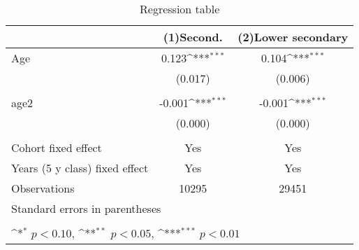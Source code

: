 \begin{table}[htbp]\centering
    \def\sym#1{\ifmmode^{#1}\else\(^{#1}\)\fi}
    \caption{Regression table \label{reg1}}
    \begin{tabular}{l*{2}{c}}
    \hline
                        &\multicolumn{1}{c}{(1)Second.}\label{reg1a}         &\multicolumn{1}{c}{(2)Lower secondary}\label{reg1b}           \\
    \hline
    Age                 &       0.123\sym{***}&       0.104\sym{***}\\
                        &     (0.017)         &     (0.006)         \\
    \\
    age2                &      -0.001\sym{***}&      -0.001\sym{***}\\
                        &     (0.000)         &     (0.000)         \\
    \\
    Cohort fixed effect           &       Yes        &       Yes        \\
    Years (5 y class) fixed effect             &       Yes       &       Yes         \\
    \hline
    Observations        &       10295         &       29451         \\
    \hline
    \multicolumn{3}{l}{\footnotesize Standard errors in parentheses}\\
    \multicolumn{3}{l}{\footnotesize }\\
    \multicolumn{3}{l}{\footnotesize \sym{*} \(p<0.10\), \sym{**} \(p<0.05\), \sym{***} \(p<0.01\)}\\
    \end{tabular}
    \end{table}
    